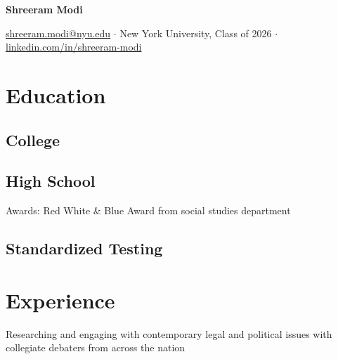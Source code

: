\documentclass[letterpaper]{resume-shreeram}
\begin{document}
\begin{center}
  {\Huge \bfseries Shreeram Modi}

  \href{mailto:shreeram.modi@nyu.edu}{shreeram.modi@nyu.edu}
  $\cdot$
  New York University, Class of 2026
  $\cdot$
  \href{https://linkedin.com/in/shreeram-modi}{linkedin.com/in/shreeram-modi}
\end{center}

\section{Education}

\subsection{College}


\subsection{High School}

\begin{compactitem}
  \item Awards: Red White \& Blue Award from social studies department
\end{compactitem}

\subsection{Standardized Testing}


\section{Experience}

\begin{compactitem}
  \item Researching and engaging with contemporary legal and political
    issues with collegiate debaters from across the nation
\end{compactitem}
\end{document}
